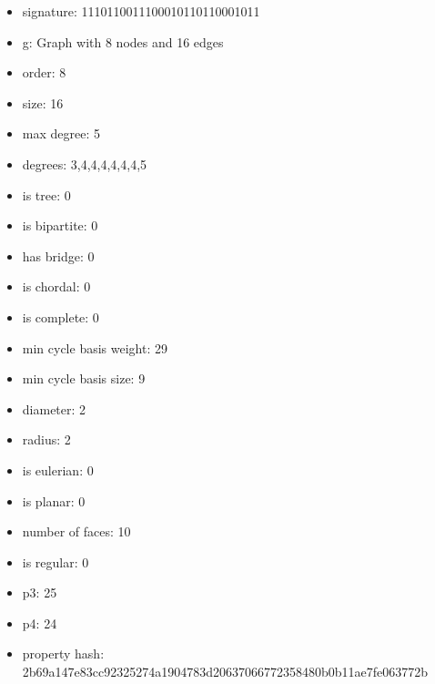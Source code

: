 \begin{itemize}
\item signature: 1110110011100010110110001011
\item g: Graph with 8 nodes and 16 edges
\item order: 8
\item size: 16
\item max degree: 5
\item degrees: 3,4,4,4,4,4,4,5
\item is tree: 0
\item is bipartite: 0
\item has bridge: 0
\item is chordal: 0
\item is complete: 0
\item min cycle basis weight: 29
\item min cycle basis size: 9
\item diameter: 2
\item radius: 2
\item is eulerian: 0
\item is planar: 0
\item number of faces: 10
\item is regular: 0
\item p3: 25
\item p4: 24
\item property hash: 2b69a147e83cc92325274a1904783d20637066772358480b0b11ae7fe063772b
\end{itemize}
\newpage
\begin{figure}
\end{figure}
